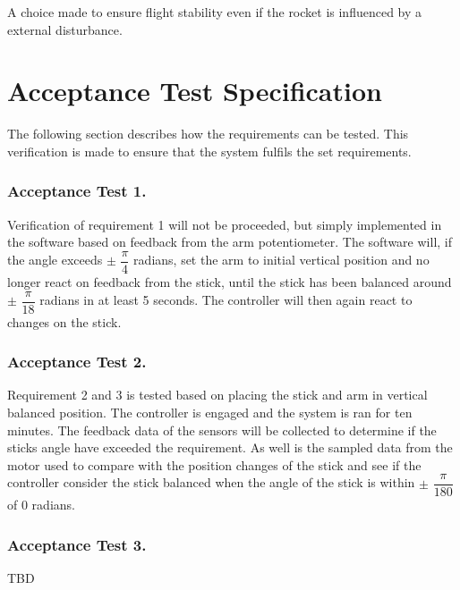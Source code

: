 \forceindent  A choice made to ensure flight stability even if the rocket is influenced by a external disturbance.

\section{Acceptance Test Specification}	
The following section describes how the requirements can be tested. This verification is made to ensure that the system fulfils the set requirements.

\subsubsection*{Acceptance Test 1.}

\forceindent Verification of requirement 1 will not be proceeded, but simply implemented in the software based on feedback from the arm potentiometer. The software will, if the angle exceeds $\pm$ $\dfrac{\pi}{4}$ radians, set the arm to initial vertical position and no longer react on feedback from the stick, until the stick has been balanced around $\pm$ $\dfrac{\pi}{18}$ radians in at least 5 seconds. The controller will then again react to changes on the stick.    

\subsubsection*{Acceptance Test 2.}

\forceindent Requirement 2 and 3 is tested based on placing the stick and arm in vertical balanced position. The controller is engaged and the system is ran for ten minutes. The feedback data of the sensors will be collected to determine if the sticks angle have exceeded the requirement. As well is the sampled data from the motor used to compare with the position changes of the stick and see if the controller consider the stick balanced when the angle of the stick is within $\pm$ $\dfrac{\pi}{180}$ of 0 radians. 

\subsubsection*{Acceptance Test 3.}
\forceindent TBD